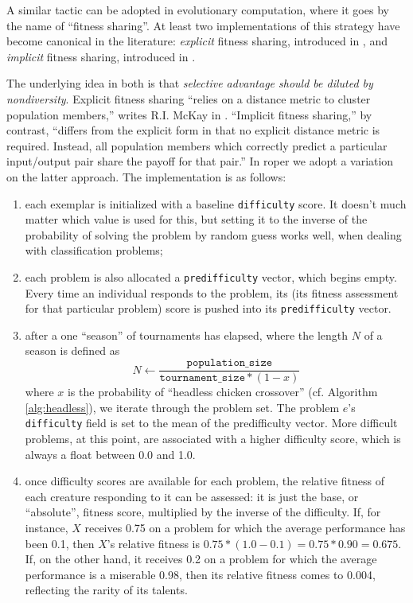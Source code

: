 \documentclass[12pt,glossary]{dalthesis}
\begin{document}
A similar tactic can be adopted in evolutionary computation, where it goes by
the name of ``fitness sharing''. At least two implementations of this strategy
have become canonical in the literature: \emph{explicit} fitness sharing, introduced
in \cite{deb89}, and \emph{implicit} fitness sharing, introduced in \cite{smith92}.

The underlying idea in both is that \emph{selective advantage should be diluted by
nondiversity}. Explicit fitness sharing ``relies on a distance metric to cluster
population members,'' writes R.I. McKay in \cite{mckay00}. ``Implicit fitness sharing,''
by contrast, ``differs from the explicit form in that no explicit distance metric
is required. Instead, all population members which correctly predict a particular
input/output pair share the payoff for that pair.'' 
In \gls{roper} we adopt a variation on the latter approach. The implementation is as
follows:

\begin{enumerate}
\item each exemplar is initialized with a baseline
\texttt{difficulty} score. It doesn't much matter which value is used for this,
but setting it to the inverse of the probability of solving the problem 
by random guess works well, when dealing with classification problems;

\item each problem is also allocated a \texttt{predifficulty} vector, which begins empty.
Every time an individual responds to the problem, its (its fitness assessment
for that particular problem) score is pushed into its \texttt{predifficulty} vector.

\item after a one ``season'' of tournaments has elapsed, where the length \(N\) 
of a season is defined as
$$N \gets \frac{\texttt{population\_size}}{\texttt{tournament\_size} * (1 - x)}$$
where \(x\) is the probability of ``headless chicken crossover'' (cf. Algorithm
\ref{alg:headless}), we iterate through the problem set. The
problem \(e\)'s \texttt{difficulty} field is set to the mean of the predifficulty
vector. More difficult problems, at this point, are associated with a higher
difficulty score, which is always a float between 0.0 and 1.0.

\item once difficulty scores are available for each problem, the relative fitness of
each creature responding to it can be assessed: it is just the base, or ``absolute'',
fitness score, multiplied by the inverse of the difficulty. If, for instance, 
\(X\) receives 0.75 on a problem for which the average performance has been
0.1, then \(X\)'s relative fitness is \(0.75 * (1.0 - 0.1) = 0.75 * 0.90 = 0.675\).
If, on the other hand, it receives 0.2 on a problem for which the average performance
is a miserable 0.98, then its relative fitness comes to 0.004, reflecting the
rarity of its talents.
\end{enumerate}
\end{document}
